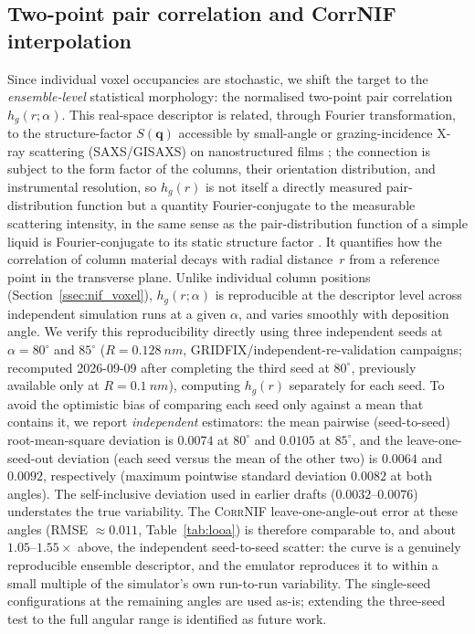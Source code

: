 \documentclass[aip,amsmath,amssymb,reprint]{revtex4-1}
\newcommand{\dang}{\ensuremath{\alpha}}
\begin{document}
\subsection{Two-point pair correlation and CorrNIF interpolation}
\label{ssec:nif_corr}

Since individual voxel occupancies are stochastic, we shift the target
to the \textit{ensemble-level} statistical morphology: the normalised
two-point pair correlation $h_g(r;\dang)$.
This real-space descriptor is related, through Fourier transformation, to
the structure-factor $S(\mathbf{q})$ accessible by small-angle or
grazing-incidence X-ray scattering (SAXS/GISAXS) on nanostructured films
\citep{renaud2009gisaxs};
the connection is subject to the form factor of the columns, their
orientation distribution, and instrumental resolution, so $h_g(r)$ is not
itself a directly measured pair-distribution function but a quantity
Fourier-conjugate to the measurable scattering intensity, in the same
sense as the pair-distribution function of a simple liquid is
Fourier-conjugate to its static structure factor \citep{hansen2013theory}.
It quantifies how the correlation of column material decays with radial
distance~$r$ from a reference point in the transverse plane.
Unlike individual column positions (Section~\ref{ssec:nif_voxel}),
$h_g(r;\dang)$ is reproducible at the descriptor level across
independent simulation runs at a given $\dang$, and varies smoothly with deposition angle.
We verify this reproducibility directly using three independent
seeds at $\dang = 80^{\circ}$ and $85^{\circ}$ ($R=\SI{0.128}{nm}$,
GRIDFIX/independent-re-validation campaigns; recomputed 2026-09-09 after
completing the third seed at $80^{\circ}$, previously available only at
$R=\SI{0.1}{nm}$), computing $h_g(r)$ separately for each seed.  To avoid
the optimistic bias of comparing each seed only against a mean that
contains it, we report \emph{independent} estimators: the mean pairwise
(seed-to-seed) root-mean-square deviation is $0.0074$ at $80^{\circ}$ and
$0.0105$ at $85^{\circ}$, and the leave-one-seed-out deviation (each seed
versus the mean of the other two) is $0.0064$ and $0.0092$, respectively
(maximum pointwise standard deviation $0.0082$ at both angles).  The
self-inclusive deviation used in earlier drafts ($0.0032$--$0.0076$)
understates the true variability.
The \textsc{CorrNIF} leave-one-angle-out error at these angles
(RMSE $\approx 0.011$, Table~\ref{tab:looa}) is therefore comparable to,
and about $1.05$--$1.55\times$ above, the independent seed-to-seed scatter:
the curve is a genuinely reproducible ensemble descriptor, and the emulator
reproduces it to within a small multiple of the simulator's own run-to-run
variability.
The single-seed configurations at the remaining angles are used as-is;
extending the three-seed test to the full angular range is identified as
future work.
\end{document}
